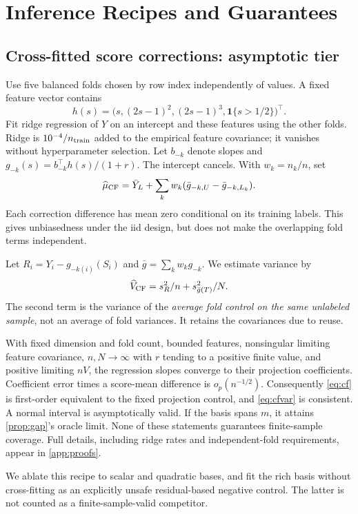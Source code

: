 \documentclass{article}
\newcommand{\ind}{\mathbf{1}}
\begin{document}
\section{Inference Recipes and Guarantees}
\subsection{Cross-fitted score corrections: asymptotic tier}
Use five balanced folds chosen by row index independently of values. A fixed feature vector contains
\[
h(s)=\big(s,(2s-1)^2,(2s-1)^3,\ind\{s>1/2\}\big)^\top.
\]
Fit ridge regression of $Y$ on an intercept and these features using the other folds. Ridge is $10^{-4}/n_{\rm train}$ added to the empirical feature covariance; it vanishes without hyperparameter selection. Let $b_{-k}$ denote slopes and $g_{-k}(s)=b_{-k}^\top h(s)/(1+r)$. The intercept cancels. With $w_k=n_k/n$, set
\begin{equation}\label{eq:cf}
\widehat\mu_{\rm CF}=\bar Y_L+
\sum_k w_k(\bar g_{-k,U}-\bar g_{-k,L_k}).
\end{equation}
Each correction difference has mean zero conditional on its training labels. This gives unbiasedness under the iid design, but does not make the overlapping fold terms independent.

Let $R_i=Y_i-g_{-k(i)}(S_i)$ and $\bar g=\sum_k w_k g_{-k}$. We estimate variance by
\begin{equation}\label{eq:cfvar}
\widehat V_{\rm CF}=s_R^2/n+s_{\bar g(T)}^2/N.
\end{equation}
The second term is the variance of the \emph{average fold control on the same unlabeled sample}, not an average of fold variances. It retains the covariances due to reuse.

With fixed dimension and fold count, bounded features, nonsingular limiting feature covariance, $n,N\to\infty$ with $r$ tending to a positive finite value, and positive limiting $nV$, the regression slopes converge to their projection coefficients. Coefficient error times a score-mean difference is $o_p(n^{-1/2})$. Consequently \cref{eq:cf} is first-order equivalent to the fixed projection control, and \cref{eq:cfvar} is consistent. A normal interval is asymptotically valid. If the basis spans $m$, it attains \cref{prop:gap}'s oracle limit. None of these statements guarantees finite-sample coverage. Full details, including ridge rates and independent-fold requirements, appear in \cref{app:proofs}.

We ablate this recipe to scalar and quadratic bases, and fit the rich basis without cross-fitting as an explicitly unsafe residual-based negative control. The latter is not counted as a finite-sample-valid competitor.
\end{document}
